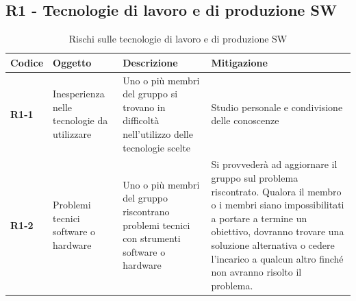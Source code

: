 \documentclass[a4paper,12pt]{article}
\begin{document}
    \subsection{R1 - Tecnologie di lavoro e di produzione SW}
        \begin{table}[H]
        \label{tab:r1} 
            \begin{tabularx}{\textwidth}{|l|L|L|L|}
            \hline
            \textbf{Codice} & \textbf{Oggetto} & \textbf{Descrizione} & \textbf{Mitigazione}\\
            \hline
            \textbf{R1-1} & Inesperienza nelle tecnologie da utilizzare & Uno o più membri del gruppo si trovano in difficoltà nell'utilizzo delle tecnologie scelte & Studio personale e condivisione delle conoscenze\\
            \hline
            \textbf{R1-2} & Problemi tecnici software o hardware & Uno o più membri del gruppo riscontrano problemi tecnici con strumenti software o hardware & Si provvederà ad aggiornare il gruppo sul problema riscontrato. Qualora il membro o i membri siano impossibilitati a portare a termine un obiettivo, dovranno trovare una soluzione alternativa o cedere l'incarico a qualcun altro finché non avranno risolto il problema.\\            
            \hline
            \end{tabularx}
            \caption{Rischi sulle tecnologie di lavoro e di produzione SW}
        \end{table}
        
\end{document}
